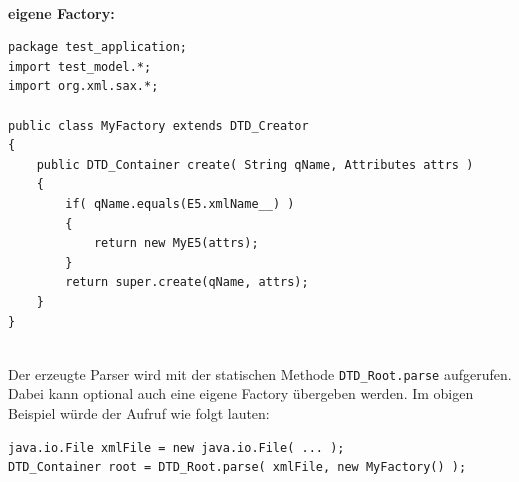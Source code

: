 \documentclass [a4paper,11pt] {scrartcl}
\begin{document}
~\\[4ex]
\begin{minipage}{\linewidth}
\textbf{eigene Factory:}
\begin{verbatim}
package test_application;
import test_model.*;
import org.xml.sax.*;

public class MyFactory extends DTD_Creator
{
    public DTD_Container create( String qName, Attributes attrs )
    {
        if( qName.equals(E5.xmlName__) )
        {
            return new MyE5(attrs);
        }
        return super.create(qName, attrs);
    }
}
\end{verbatim}
\end{minipage}
~\\[4ex]
Der erzeugte Parser wird mit der statischen Methode \texttt{DTD\_Root.parse} aufgerufen.
Dabei kann optional auch eine eigene Factory {\"u}bergeben werden. Im obigen Beispiel
w{\"u}rde der Aufruf wie folgt lauten:
\begin{verbatim}
java.io.File xmlFile = new java.io.File( ... );
DTD_Container root = DTD_Root.parse( xmlFile, new MyFactory() );
\end{verbatim}
\end{document}
